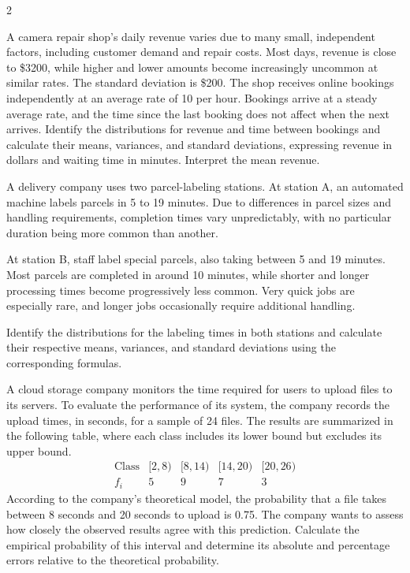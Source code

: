 \begin{multicols}{2}
\label{sec:c5-2}

A camera repair shop's daily revenue varies due to many small, independent
factors, including customer demand and repair costs. Most days, revenue
is close to \$3200, while higher and lower amounts become increasingly
uncommon at similar rates. The standard deviation is \$200.
The shop receives online bookings independently at an average rate of
10 per hour. Bookings arrive at a steady average rate, and the time since
the last booking does not affect when the next arrives.
Identify the distributions for revenue and time between bookings and calculate their means,
variances, and standard deviations, expressing revenue in dollars and
waiting time in minutes. Interpret the mean revenue. 


\newpage

\label{sec:c5-3}
A delivery company uses two parcel-labeling stations. At station A, an
automated machine labels parcels in 5 to 19 minutes. Due to differences
in parcel sizes and handling requirements, completion times vary
unpredictably, with no particular duration being more common than another.

At station B, staff label special parcels, also taking between 5 and
19 minutes. Most parcels are completed in around 10 minutes, while
shorter and longer processing times become progressively less common.
Very quick jobs are especially rare, and longer jobs occasionally
require additional handling.

Identify the distributions for the labeling times in both stations and calculate their respective means, variances, and standard deviations
using the corresponding formulas. 


\label{sec:c6-1}
A cloud storage company monitors the time required for users to upload files
to its servers. To evaluate the performance of its system, the company
records the upload times, in seconds, for a sample of 24 files. The results
are summarized in the following table, where each class includes its lower
bound but excludes its upper bound.
\[
\begin{array}{c|rrrr}
	\text{Class}&[2,8)&[8,14)&[14,20)&[20,26)\\\hline
	f_i&5&9&7&3
\end{array}
\]
According to the company's theoretical model, the probability that a file
takes between 8 seconds and 20 seconds to upload is
0.75. The company wants to assess how closely the observed results agree
with this prediction. Calculate the empirical probability of this interval
and determine its absolute and percentage errors relative to the
theoretical probability. 



\end{multicols}
